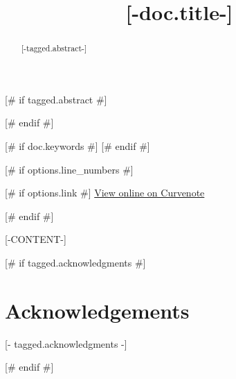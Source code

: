 \documentclass{article} %
\title{[-doc.title-]}
\author[[-author.index-]]{[-author.name-][# if author.orcid #]\href{https://orcid.org/[-author.orcid-]}{\orcidicon}[# endif #]}
[# endfor #]
[# for author in doc.authors #]
\affil[[-author.index-]]{[-author.affiliations|join(", ", "value")-]}
[# endfor #]
\begin{document}
\maketitle

[# if tagged.abstract #]
\begin{abstract}
[-tagged.abstract-]\\
\end{abstract}
[# endif #]

[# if doc.keywords #]
[# endif #]

\vspace{0.35cm}

[# if options.line_numbers #]\linenumbers[# endif #]

[# if options.link #]
\footnotesize
\href{[-options.link-]}{View online on Curvenote}

\normalsize
[# endif #]


[-CONTENT-]

[# if tagged.acknowledgments #]
\footnotesize
\section*{Acknowledgements}
[- tagged.acknowledgments -]

\normalsize
[# endif #]



\end{document}
